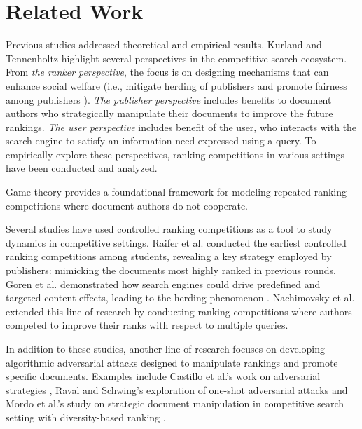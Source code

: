 \section{Related Work}
Previous studies addressed theoretical and empirical results. Kurland and Tennenholtz \cite{kurland_competitive_2022} highlight several perspectives in the competitive search ecosystem. From \textit{the ranker perspective}, the focus is on designing mechanisms that can enhance social welfare (i.e., mitigate herding of publishers and promote fairness among publishers \cite{kurland_competitive_2022}). \textit{The publisher perspective} includes benefits to document authors who strategically manipulate their documents to improve the future rankings. \textit{The user perspective} includes benefit of the user, who interacts with the search engine to satisfy an information need expressed using a query. To empirically explore these perspectives, ranking competitions in various settings have been conducted and analyzed.

 Game theory \cite{aumann1995repeated, fudenberg_game_1991} provides a foundational framework for modeling repeated ranking competitions where document authors do not cooperate.

Several studies have used controlled ranking competitions as a tool to study dynamics in competitive settings. Raifer et al. \cite{raifer_information_2017} conducted the earliest controlled ranking competitions among students, revealing a key strategy employed by publishers: mimicking the documents most highly ranked in previous rounds. Goren et al. \cite{goren_driving_2021} demonstrated how search engines could drive predefined and targeted content effects, leading to the herding phenomenon \cite{banerjee_simple_1992}. Nachimovsky et al. \cite{nachimovsky_ranking-incentivized_2024} extended this line of research by conducting ranking competitions where authors competed to improve their ranks with respect to multiple queries.

In addition to these studies, another line of research focuses on developing algorithmic adversarial attacks designed to manipulate rankings and promote specific documents. Examples include Castillo et al.'s work on adversarial strategies \cite{castilo_adverserial}, Raval and Schwing's exploration of one-shot adversarial attacks \cite{raval_one_2020} and Mordo et al.'s study on strategic document manipulation in competitive search setting with diversity-based ranking \cite{mordo_search_2025}.


